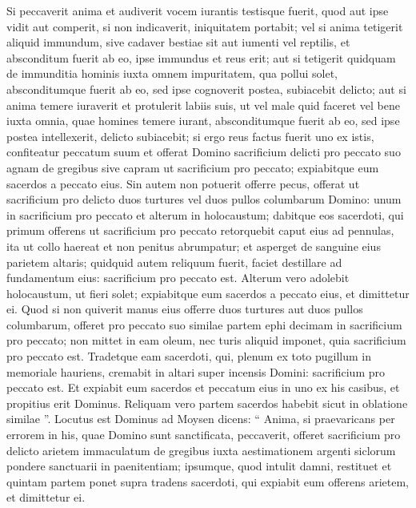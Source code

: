 \begin{biblechapter}
\begin{biblechapter}
\begin{biblechapter}
\begin{biblechapter}
\begin{biblechapter}
\verse Si peccaverit anima et audiverit vocem iurantis testisque fuerit, quod aut ipse vidit aut comperit, si non indicaverit, iniquitatem portabit; 
\verse vel si anima tetigerit aliquid immundum, sive cadaver bestiae sit aut iumenti vel reptilis, et absconditum fuerit ab eo, ipse immundus et reus erit; 
\verse aut si tetigerit quidquam de immunditia hominis iuxta omnem impuritatem, qua pollui solet, absconditumque fuerit ab eo, sed ipse cognoverit postea, subiacebit delicto; 
\verse aut si anima temere iuraverit et protulerit labiis suis, ut vel male quid faceret vel bene iuxta omnia, quae homines temere iurant, absconditumque fuerit ab eo, sed ipse postea intellexerit, delicto subiacebit; 
 \verse si ergo reus factus fuerit uno ex istis, confiteatur peccatum suum 
\verse et offerat Domino sacrificium delicti pro peccato suo agnam de gregibus sive capram ut sacrificium pro peccato; expiabitque eum sacerdos a peccato eius.
 \verse Sin autem non potuerit offerre pecus, offerat ut sacrificium pro delicto duos turtures vel duos pullos columbarum Domino: unum in sacrificium pro peccato et alterum in holocaustum; 
\verse dabitque eos sacerdoti, qui primum offerens ut sacrificium pro peccato retorquebit caput eius ad pennulas, ita ut collo haereat et non penitus abrumpatur; 
\verse et asperget de sanguine eius parietem altaris; quidquid autem reliquum fuerit, faciet destillare ad fundamentum eius: sacrificium pro peccato est. 
\verse Alterum vero adolebit holocaustum, ut fieri solet; expiabitque eum sacerdos a peccato eius, et dimittetur ei.
 \verse Quod si non quiverit manus eius offerre duos turtures aut duos pullos columbarum, offeret pro peccato suo similae partem ephi decimam in sacrificium pro peccato; non mittet in eam oleum, nec turis aliquid imponet, quia sacrificium pro peccato est. 
\verse Tradetque eam sacerdoti, qui, plenum ex toto pugillum in memoriale hauriens, cremabit in altari super incensis Domini: sacrificium pro peccato est. 
\verse Et expiabit eum sacerdos et peccatum eius in uno ex his casibus, et propitius erit Dominus. Reliquam vero partem sacerdos habebit sicut in oblatione similae ”.
 \verse Locutus est Dominus ad Moysen dicens: 
\verse “ Anima, si praevaricans per errorem in his, quae Domino sunt sanctificata, peccaverit, offeret sacrificium pro delicto arietem immaculatum de gregibus iuxta aestimationem argenti siclorum pondere sanctuarii in paenitentiam; 
\verse ipsumque, quod intulit damni, restituet et quintam partem ponet supra tradens sacerdoti, qui expiabit eum offerens arietem, et dimittetur ei.

\end{biblechapter}
\end{biblechapter}
\end{biblechapter}
\end{biblechapter}
\end{biblechapter}
